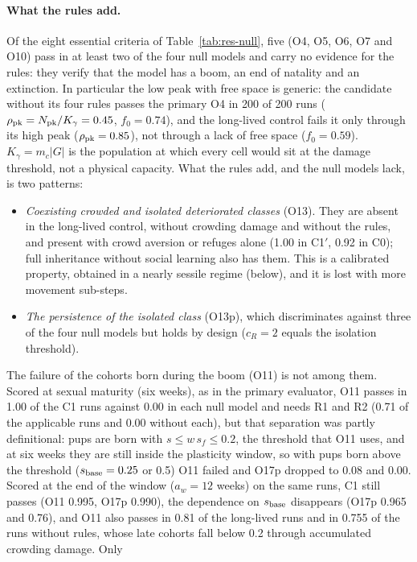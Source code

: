 \paragraph{What the rules add.}
Of the eight essential criteria of Table~\ref{tab:res-null}, five (O4, O5, O6, O7 and O10) pass in at least two of
the four null models and carry no evidence for the rules: they verify that the model has a boom, an end of natality
and an extinction. In particular the low peak with free space is generic: the candidate without its four rules
passes the primary O4 in 200 of 200 runs ($\rho_{\rm pk}=N_{\rm pk}/K_\gamma=0.45$, $f_0=0.74$), and the long-lived
control fails it only through its high peak ($\rho_{\rm pk}=0.85$), not through a lack of free space ($f_0=0.59$).
$K_\gamma=m_c|G|$ is the population at which every cell would sit at the damage threshold, not a physical capacity.
What the rules add, and the null models lack, is two patterns:
\begin{itemize}
\item \emph{Coexisting crowded and isolated deteriorated classes} (O13). They are absent in the long-lived control,
  without crowding damage and without the rules, and present with crowd aversion or refuges alone (1.00 in
  \textsf{C1}$'$, 0.92 in \textsf{C0}); full inheritance without social learning also has them. This is a
  calibrated property, obtained in a nearly sessile regime (below), and it is lost with more movement sub-steps.
\item \emph{The persistence of the isolated class} (O13p), which discriminates against three of the four null models
  but holds by design ($c_R=2$ equals the isolation threshold).
\end{itemize}
The failure of the cohorts born during the boom (O11) is not among them. Scored at sexual maturity (six weeks), as
in the primary evaluator, O11 passes in 1.00 of the \textsf{C1} runs against 0.00 in each null model and needs R1
and R2 (0.71 of the applicable runs and 0.00 without each), but that separation was partly definitional: pups are born with
$s\le w\,s_f\le0.2$, the threshold that O11 uses, and at six weeks they are still inside the plasticity window, so
with pups born above the threshold ($s_{\rm base}=0.25$ or 0.5) O11 failed and O17p dropped to 0.08 and 0.00.
Scored at the end of the window ($a_w=12$ weeks) on the same runs, \textsf{C1} still passes (O11 0.995, O17p 0.990),
the dependence on $s_{\rm base}$ disappears (O17p 0.965 and 0.76), and O11 also passes in 0.81 of the long-lived runs
and in 0.755 of the runs without rules, whose late cohorts fall below 0.2 through accumulated crowding damage. Only
